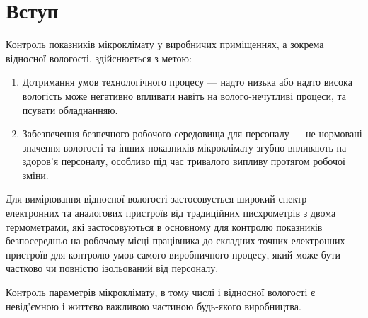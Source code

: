 \chapter*{Вступ}

Контроль показників мікроклімату у виробничих приміщеннях, а зокрема відносної вологості,
здійснюється з метою:

\begin{enumerate}
\item Дотримання умов технологічного процесу --- надто низька або надто висока вологість може
  негативно впливати навіть на волого-нечутливі процеси, та псувати обладнанняю.
\item Забезпечення безпечного робочого середовища для персоналу --- не нормовані значення вологості
  та інших показників мікроклімату згубно впливають на здоров'я персоналу, особливо під час
  тривалого випливу протягом робочої зміни.
\end{enumerate}

Для вимірювання відносної вологості застосовується широкий спектр електронних та аналогових
пристроїв від традиційних писхрометрів з двома термометрами, які застосовуються в основному для
контролю показників безпосередньо на робочому місці працівника до складних точних електронних
пристроїв для контролю умов самого виробничного процесу, який може бути частково чи повністю
ізольований від персоналу.

Контроль параметрів мікроклімату, в тому числі і відносної вологості є невід'ємною і життєво важливою
частиною будь-якого виробництва.
